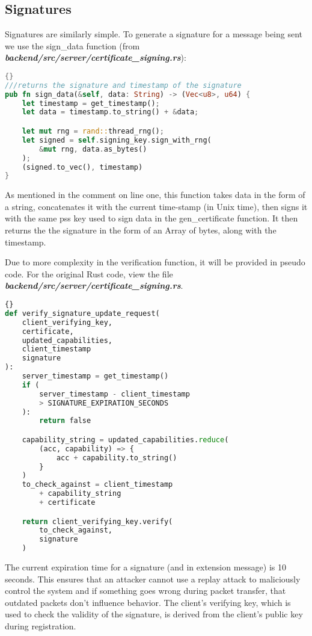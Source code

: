 \subsection{Signatures} \label{sec:chapimpl:security:signatures}
Signatures are similarly simple. To generate a signature for a message being sent we use the sign\_data function (from \textit{\textbf{backend/src/server/certificate\_signing.rs}}):
\begin{lstlisting}[language=Rust, style=boxed, showstringspaces=false]{}
///returns the signature and timestamp of the signature
pub fn sign_data(&self, data: String) -> (Vec<u8>, u64) {
    let timestamp = get_timestamp();
    let data = timestamp.to_string() + &data;

    let mut rng = rand::thread_rng();
    let signed = self.signing_key.sign_with_rng(
        &mut rng, data.as_bytes()
    );
    (signed.to_vec(), timestamp)
}
\end{lstlisting}
As mentioned in the comment on line one, this function takes data in the form of a string, concatenates it with the current time-stamp (in Unix time), then signs it with the same pss key used to sign data in the gen\_certificate function. It then returns the the signature in the form of an Array of bytes, along with the timestamp.

Due to more complexity in the verification function, it will be provided in pseudo code. For the original Rust code, view the file \textit{\textbf{backend/src/server/certificate\_signing.rs}}. 
\begin{lstlisting}[language=Python, style=boxed, showstringspaces=false]{}
def verify_signature_update_request(
    client_verifying_key,
    certificate,
    updated_capabilities,
    client_timestamp
    signature
):
    server_timestamp = get_timestamp()
    if (
        server_timestamp - client_timestamp 
        > SIGNATURE_EXPIRATION_SECONDS
    ):
        return false

    capability_string = updated_capabilities.reduce(
        (acc, capability) => {
            acc + capability.to_string()
        }
    )
    to_check_against = client_timestamp 
        + capability_string
        + certificate

    return client_verifying_key.verify(
        to_check_against,
        signature
    )
\end{lstlisting}
The current expiration time for a signature (and in extension message) is 10 seconds. This ensures that an attacker cannot use a replay attack to maliciously control the system and if something goes wrong during packet transfer, that outdated packets don't influence behavior. The client's verifying key, which is used to check the validity of the signature, is derived from the client's public key during registration.

